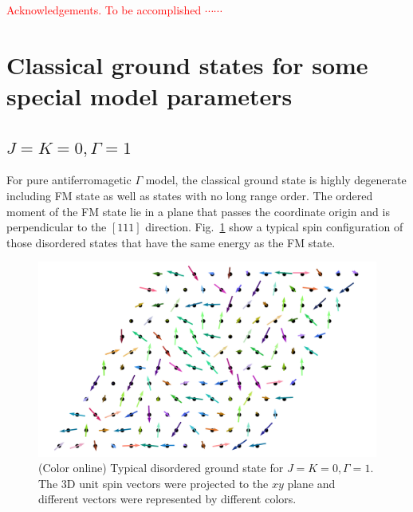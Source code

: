 \documentclass[aps,prb,reprint,amsfonts,amsmath,amssymb,showpacs,groupedaddress,superscriptaddress]{revtex4-1}
\begin{document}
\begin{acknowledgments}
    \textcolor{red}{Acknowledgements.  To be accomplished $\cdots \cdots$}
\end{acknowledgments}


\newpage
\appendix

\section{\label{apx:AppendixA}Classical ground states for some special model parameters}

\subsection{$J=K=0, \Gamma=1$}
For pure antiferromagetic $\Gamma$ model, the classical ground state is highly degenerate including FM state as well as states with no long range order. The ordered moment of the FM state lie in a plane that passes the coordinate origin and is perpendicular to the $[111]$ direction. Fig.~\ref{fig:GSForPositiveGamma} show a typical spin configuration of those disordered states that have the same energy as the FM state.
\begin{figure}
    \centering
    \includegraphics[width=\columnwidth]{fig/SpinConfigForPositiveGamma.pdf}
    \caption{\label{fig:GSForPositiveGamma}(Color online) Typical disordered ground state for $J=K=0, \Gamma=1$. The 3D unit spin vectors were projected to the $xy$ plane and different vectors were represented by different colors.}
\end{figure}
\end{document}
